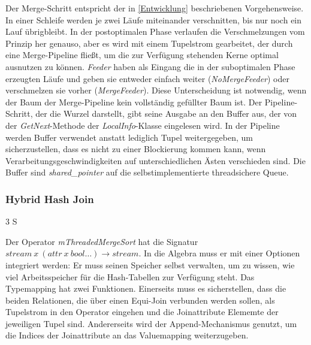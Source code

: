 \documentclass[a4paper,12pt,twoside]{article}
\newcommand{\Fb}[1]{\textit{#1}} %
\begin{document}
Der Merge-Schritt entspricht der in \autoref{Entwicklung} beschriebenen Vorgehensweise. In einer Schleife werden je zwei Läufe miteinander verschnitten, bis nur noch ein Lauf übrigbleibt. In der postoptimalen Phase verlaufen die Verschmelzungen vom Prinzip her genauso, aber es wird mit einem Tupelstrom gearbeitet, der durch eine Merge-Pipeline fließt, um die zur Verfügung stehenden Kerne optimal ausnutzen zu können. \Fb{Feeder} haben als Eingang die in der suboptimalen Phase erzeugten Läufe und geben sie entweder einfach weiter (\Fb{NoMergeFeeder}) oder verschmelzen sie vorher (\Fb{MergeFeeder}). Diese Unterscheidung ist notwendig, wenn der Baum der Merge-Pipeline kein vollständig gefüllter Baum ist. Der Pipeline-Schritt, der die Wurzel darstellt, gibt seine Ausgabe an den Buffer aus, der von der \Fb{GetNext}-Methode der \Fb{LocalInfo}-Klasse eingelesen wird. In der Pipeline werden Buffer verwendet anstatt lediglich Tupel weitergegeben, um sicherzustellen, dass es nicht zu einer Blockierung kommen kann, wenn Verarbeitungsgeschwindigkeiten auf unterschiedlichen Ästen verschieden sind. Die Buffer sind \Fb{shared\_pointer} auf die selbstimplementierte threadsichere Queue.  


\subsubsection{Hybrid Hash Join} 3 S

Der Operator \Fb{mThreadedMergeSort} hat die Signatur $stream~x~(attr~x~bool \ldots) \longrightarrow stream$. In die Algebra muss er mit einer Optionen integriert werden: Er muss seinen Speicher selbst verwalten, um zu wissen, wie viel Arbeitsspeicher für die Hash-Tabellen zur Verfügung steht. Das Typemapping hat zwei Funktionen. Einerseits muss es sicherstellen, dass die beiden Relationen, die über einen Equi-Join verbunden werden sollen, als Tupelstrom in den Operator eingehen und die Joinattribute Elememte der jeweiligen Tupel sind. Andererseits wird der Append-Mechanismus genutzt, um die Indices der Joinattribute an das Valuemapping weiterzugeben.
\end{document}
